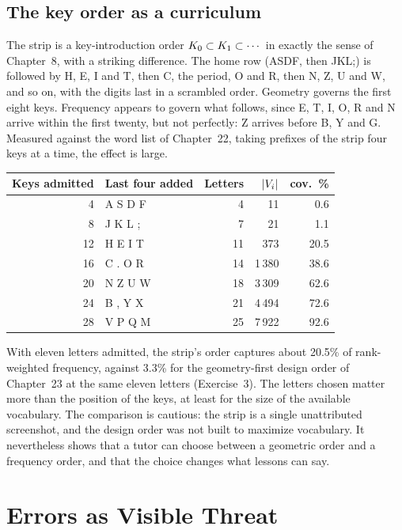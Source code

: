 \subsection{The key order as a curriculum}

The strip is a key-introduction order $K_0\subset K_1\subset\cdots$ in exactly the sense of Chapter~8, with a striking difference. The home row (ASDF, then JKL;) is followed by H, E, I and T, then C, the period, O and R, then N, Z, U and W, and so on, with the digits last in a scrambled order. Geometry governs the first eight keys. Frequency appears to govern what follows, since E, T, I, O, R and N arrive within the first twenty, but not perfectly: Z arrives before B, Y and G. Measured against the word list of Chapter~22, taking prefixes of the strip four keys at a time, the effect is large.

\begin{center}
\begin{tabular}{@{}rlrrr@{}}
\toprule
Keys admitted & Last four added & Letters & $|V_i|$ & cov.\ \% \\
\midrule
4 & A S D F & 4 & 11 & 0.6 \\
8 & J K L ; & 7 & 21 & 1.1 \\
12 & H E I T & 11 & 373 & 20.5 \\
16 & C . O R & 14 & 1\,380 & 38.6 \\
20 & N Z U W & 18 & 3\,309 & 62.6 \\
24 & B , Y X & 21 & 4\,494 & 72.6 \\
28 & V P Q M & 25 & 7\,922 & 92.6 \\
\bottomrule
\end{tabular}
\end{center}

With eleven letters admitted, the strip's order captures about 20.5\% of rank-weighted frequency, against 3.3\% for the geometry-first design order of Chapter~23 at the same eleven letters (Exercise~3). The letters chosen matter more than the position of the keys, at least for the size of the available vocabulary. The comparison is cautious: the strip is a single unattributed screenshot, and the design order was not built to maximize vocabulary. It nevertheless shows that a tutor can choose between a geometric order and a frequency order, and that the choice changes what lessons can say. 

\section{Errors as Visible Threat}

